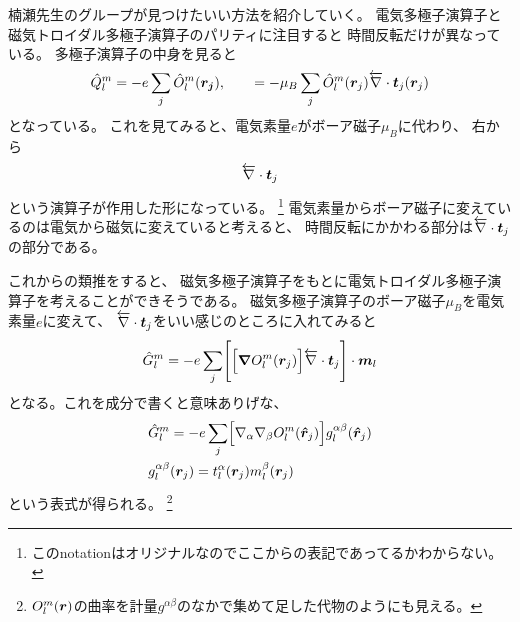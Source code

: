 \documentclass[../master.tex]{subfiles}
\begin{document}
楠瀬先生のグループが見つけたいい方法を紹介していく。
電気多極子演算子と磁気トロイダル多極子演算子のパリティに注目すると
時間反転だけが異なっている。
多極子演算子の中身を見ると
\begin{equation}
    \hat{Q}_l^m= -e \sum_{j} \hat{O}_l^m(\vb*{r_j}), \qquad
    = -\mu_B \sum_j   \hat{O}_l^m(\vb*{r}_j)  \overleftarrow{\nabla} \cdot \vb*{t}_j(\vb*{r}_j)
\end{equation}
となっている。
これを見てみると、電気素量\(e\)がボーア磁子\(\mu_B\)に代わり、
右から
\begin{equation}
    \overleftarrow{\nabla} \cdot \vb*{t}_j
\end{equation}
という演算子が作用した形になっている。
\footnote{このnotationはオリジナルなのでここからの表記であってるかわからない。}
電気素量からボーア磁子に変えているのは電気から磁気に変えていると考えると、
時間反転にかかわる部分は\(\overleftarrow{\nabla} \cdot \vb*{t}_j\)の部分である。

これからの類推をすると、
磁気多極子演算子をもとに電気トロイダル多極子演算子を考えることができそうである。
磁気多極子演算子のボーア磁子\(\mu_B\)を電気素量\(e\)に変えて、
\(\overleftarrow{\nabla} \cdot \vb*{t}_j\)をいい感じのところに入れてみると
\begin{equation}
    \hat{G}_l^m = -e\sum_j\Biggl[\Bigl[\grad O_l^m(\vb*{r}_j)\Bigr] \overleftarrow{\nabla} \cdot \vb*{t}_j \Biggr]\cdot\vb*{m}_l
\end{equation}
となる。これを成分で書くと意味ありげな、
\begin{align}
    &\hat{G}_l^m = -e\sum_j\Bigl[\nabla_\alpha\nabla_\beta O_l^m(\vb*{\hat{r}}_j)\Bigr] g_l^{\alpha \beta}(\vb*{\hat{r}}_j)\\
    &g_l^{\alpha \beta}(\vb*{r}_j) = t_l^\alpha(\vb*{r}_j)m_l^\beta(\vb*{r}_j)
\end{align}
という表式が得られる。
\footnote{\(O_l^m(\vb*{r})\)の曲率を計量\(g^{\alpha\beta}\)のなかで集めて足した代物のようにも見える。}
\end{document}

